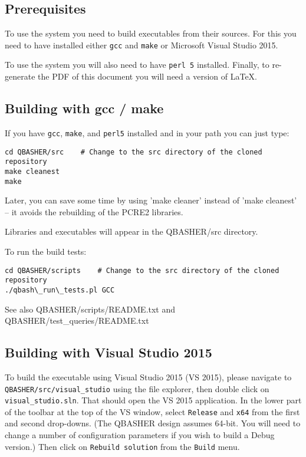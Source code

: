 \documentclass{article}
\begin{document}
\subsection{Prerequisites}

To use the system you need to build executables from their sources.
For this you need to have installed either \texttt{gcc} and
\texttt{make} or Microsoft Visual Studio 2015.

To use the system you will also need to have \texttt{perl 5}
installed.  Finally, to re-generate the PDF of this document you will
need a version of LaTeX.

\subsection{Building with gcc / make}

If you have \texttt{gcc}, \texttt{make}, and \texttt{perl5} installed
and in your path you can just type:

\begin{verbatim}
cd QBASHER/src    # Change to the src directory of the cloned repository
make cleanest
make
\end{verbatim}

Later, you can save some time by using 'make cleaner' instead of 'make
cleanest' -- it avoids the rebuilding of the PCRE2 libraries.

Libraries and executables will appear in the QBASHER/src directory.

\noindent To run the build tests:

\begin{verbatim}
cd QBASHER/scripts    # Change to the src directory of the cloned repository
./qbash\_run\_tests.pl GCC
\end{verbatim}

See also QBASHER/scripts/README.txt and QBASHER/test\_queries/README.txt


\subsection{Building with Visual Studio 2015}

To build the executable using Visual Studio 2015 (VS 2015), please navigate to
\texttt{QBASHER/src/visual\_studio} using the file explorer, then
double click on \texttt{visual\_studio.sln}. That should open the VS
2015 application.  In the lower part of the toolbar at the top
of the VS window, select \texttt{Release} and \texttt{x64} from the
first and second drop-downs.  (The QBASHER design assumes 64-bit.
You will need to change a number of configuration parameters if you
wish to build a Debug version.)
Then click on \texttt{Rebuild solution}
from the \texttt{Build} menu.  
\end{document}
